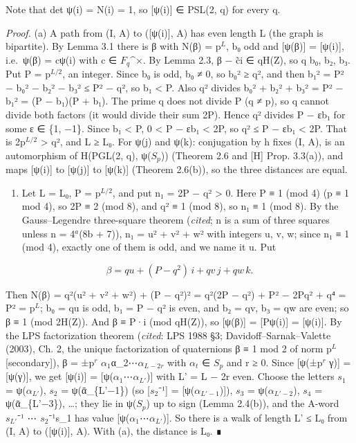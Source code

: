 \documentclass[
  10pt,
]{article}
\providecommand{\tightlist}{%
  \setlength{\itemsep}{0pt}\setlength{\parskip}{0pt}}
\begin{document}
Note that det ψ(i) = N(i) = 1, so {[}ψ(i){]} ∈ PSL(2, q) for every q.

\emph{Proof.} (a) A path from (I, A) to ({[}ψ(i){]}, A) has even length
L (the graph is bipartite). By Lemma 3.1 there is β with N(β) =
p\(^{L}\), b₀ odd and {[}ψ(β){]} = {[}ψ(i){]}, i.e.~ψ(β) = cψ(i) with c
∈ \(F_{q}\)\^{}×. By Lemma 2.3, β − c̃i ∈ qH(Z), so q \textbar{} b₀, b₂,
b₃. Put P = p\(^{L/2}\), an integer. Since b₀ is odd, b₀ ≠ 0, so b₀² ≥
q², and then b₁² = P² − b₀² − b₂² − b₃² ≤ P² − q², so
\textbar b₁\textbar{} \textless{} P. Also q² divides b₀² + b₂² + b₃² =
P² − b₁² = (P − b₁)(P + b₁). The prime q does not divide P (q ≠ p), so q
cannot divide both factors (it would divide their sum 2P). Hence q²
divides P − εb₁ for some ε ∈ \{1, −1\}. Since \textbar b₁\textbar{}
\textless{} P, 0 \textless{} P − εb₁ \textless{} 2P, so q² ≤ P − εb₁
\textless{} 2P. That is 2p\(^{L/2}\) \textgreater{} q², and L ≥ L₀. For
ψ(j) and ψ(k): conjugation by h fixes (I, A), is an automorphism of
H(PGL(2, q), ψ(\(S_{p}\))) (Theorem 2.6 and {[}H{]} Prop. 3.3(a)), and
maps {[}ψ(i){]} to {[}ψ(j){]} to {[}ψ(k){]} (Theorem 2.6(b)), so the
three distances are equal.

\begin{enumerate}
\def\labelenumi{(\alph{enumi})}
\setcounter{enumi}{1}
\tightlist
\item
  Let L = L₀, P = p\(^{L/2}\), and put n₁ = 2P − q² \textgreater{} 0.
  Here P ≡ 1 (mod 4) (p ≡ 1 mod 4), so 2P ≡ 2 (mod 8), and q² ≡ 1 (mod
  8), so n₁ ≡ 1 (mod 8). By the Gauss--Legendre three-square theorem
  (\emph{cited}; n is a sum of three squares unless n = 4\(^{a}\)(8b +
  7)), n₁ = u² + v² + w² with integers u, v, w; since n₁ ≡ 1 (mod 4),
  exactly one of them is odd, and we name it u. Put
\end{enumerate}

\[\beta = qu + (P - q^2)\,i + qv\,j + qw\,k .\]

Then N(β) = q²(u² + v² + w²) + (P − q²)² = q²(2P − q²) + P² − 2Pq² + q⁴
= P² = p\(^{L}\); b₀ = qu is odd, b₁ = P − q² is even, and b₂ = qv, b₃ =
qw are even; so β ≡ 1 (mod 2H(Z)). And β ≡ P·i (mod qH(Z)), so
{[}ψ(β){]} = {[}Pψ(i){]} = {[}ψ(i){]}. By the LPS factorization theorem
(\emph{cited}: LPS 1988 §3; Davidoff--Sarnak--Valette (2003), Ch. 2, the
unique factorization of quaternions β ≡ 1 mod 2 of norm p\(^{L}\)
{[}secondary{]}), β = ±p\(^{r}\) \(α_{1}\)α\_2⋯\(α_{L−2r}\) with
\(α_{t}\) ∈ \(S_{p}\) and r ≥ 0. Since {[}ψ(±p\(^{r}\) γ){]} =
{[}ψ(γ){]}, we get {[}ψ(i){]} = {[}ψ(\(α_{1}\)⋯\(α_{L'}\)){]} with L' =
L − 2r even. Choose the letters \(s_{1}\) = ψ(\(α_{L'}\)), \(s_{2}\) =
ψ(ᾱ\_\{L'−1\}) (so {[}\(s_{2}\)⁻¹{]} = {[}ψ(\(α_{L'−1}\)){]}), \(s_{3}\)
= ψ(\(α_{L'−2}\)), \(s_{4}\) = ψ(ᾱ\_\{L'−3\}), \ldots; they lie in
ψ(\(S_{p}\)) up to sign (Lemma 2.4(b)), and the A-word \(s_{L'}\)⁻¹ ⋯
\(s_{2}\)⁻¹s\_1 has value {[}ψ(\(α_{1}\)⋯\(α_{L'}\)){]}. So there is a
walk of length L' ≤ L₀ from (I, A) to ({[}ψ(i){]}, A). With (a), the
distance is L₀. ∎
\end{document}
